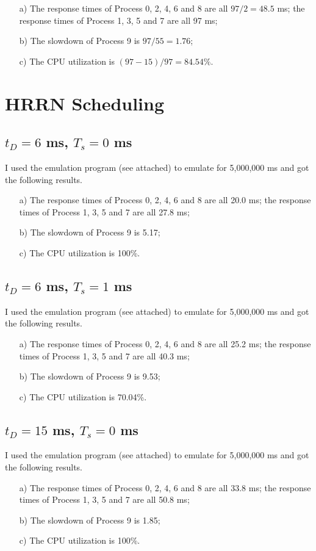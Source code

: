 \documentclass[12pt,letterpaper]{article}
\begin{document}
\begin{enumerate}
\item[a)] The response times of Process 0, 2, 4, 6 and 8 are all $97/2=48.5$ ms; the response times of Process 1, 3, 5 and 7 are all 97 ms;
\item[b)] The slowdown of Process 9 is $97/55=1.76$;
\item[c)] The CPU utilization is $(97-15)/97=84.54\%$.
\end{enumerate}

\section{HRRN Scheduling}
\subsection{$t_D=6$ ms, $T_s = 0$ ms}
I used the emulation program (see attached) to emulate for 5,000,000 ms and got the following results.
\begin{enumerate}
\item[a)] The response times of Process 0, 2, 4, 6 and 8 are all 20.0 ms; the response times of Process 1, 3, 5 and 7 are all 27.8 ms;
\item[b)] The slowdown of Process 9 is 5.17;
\item[c)] The CPU utilization is 100\%.
\end{enumerate}

\subsection{$t_D=6$ ms, $T_s = 1$ ms}
I used the emulation program (see attached) to emulate for 5,000,000 ms and got the following results.
\begin{enumerate}
\item[a)] The response times of Process 0, 2, 4, 6 and 8 are all 25.2 ms; the response times of Process 1, 3, 5 and 7 are all 40.3 ms;
\item[b)] The slowdown of Process 9 is 9.53;
\item[c)] The CPU utilization is 70.04\%.
\end{enumerate}

\subsection{$t_D=15$ ms, $T_s = 0$ ms}
I used the emulation program (see attached) to emulate for 5,000,000 ms and got the following results.
\begin{enumerate}
\item[a)] The response times of Process 0, 2, 4, 6 and 8 are all 33.8 ms; the response times of Process 1, 3, 5 and 7 are all 50.8 ms;
\item[b)] The slowdown of Process 9 is 1.85;
\item[c)] The CPU utilization is 100\%.
\end{enumerate}
\end{document}
